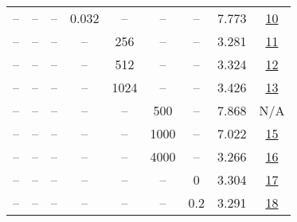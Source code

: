 \begin{table}[H]
\begin{tabular}{ccccccccc}
-- & -- & -- & 0.032 & -- & -- & -- & 7.773 & \href{https://wandb.ai/stanford-mercury/optimizer-scaling/runs/sweep-130m-21B-minid9a283lr0.032-wd0.1-minlr0-warmup2000-b10.9-b-3d6c8c}{10} \\
-- & -- & -- & -- & 256 & -- & -- & 3.281 & \href{https://wandb.ai/stanford-mercury/optimizer-scaling/runs/sweep-130m-21B-mini8e0689lr0.008-wd0.1-minlr0-warmup2000-b10.9-b-f8ffc0}{11} \\
-- & -- & -- & -- & 512 & -- & -- & 3.324 & \href{https://wandb.ai/stanford-mercury/optimizer-scaling/runs/sweep-130m-21B-mini5a8324lr0.008-wd0.1-minlr0-warmup2000-b10.9-b-82522f}{12} \\
-- & -- & -- & -- & 1024 & -- & -- & 3.426 & \href{https://wandb.ai/stanford-mercury/optimizer-scaling/runs/sweep-130m-21B-mini845331lr0.008-wd0.1-minlr0-warmup2000-b10.9-b-05faa2}{13} \\
-- & -- & -- & -- & -- & 500 & -- & 7.868 & N/A \\
-- & -- & -- & -- & -- & 1000 & -- & 7.022 & \href{https://wandb.ai/stanford-mercury/optimizer-scaling/runs/sweep-130m-21B-mini056a5flr0.008-wd0.1-minlr0-warmup1000-b10.9-b-d7cc88}{15} \\
-- & -- & -- & -- & -- & 4000 & -- & 3.266 & \href{https://wandb.ai/stanford-mercury/optimizer-scaling/runs/sweep-130m-21B-mini9445d9lr0.008-wd0.1-minlr0-warmup4000-b10.9-b-ae303f}{16} \\
-- & -- & -- & -- & -- & -- & 0 & 3.304 & \href{https://wandb.ai/stanford-mercury/optimizer-scaling/runs/sweep-130m-21B-mini2e27bblr0.008-wd0-minlr0-warmup2000-b10.9-b20-c75282}{17} \\
-- & -- & -- & -- & -- & -- & 0.2 & 3.291 & \href{https://wandb.ai/stanford-mercury/optimizer-scaling/runs/sweep-130m-21B-mini593df5lr0.008-wd0.2-minlr0-warmup2000-b10.9-b-27dd40}{18} \\
\bottomrule
\end{tabular}
\end{table}

